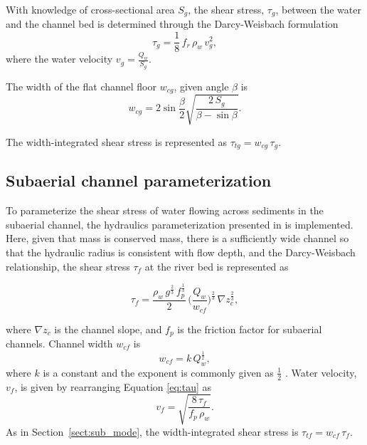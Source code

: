 \documentclass[11pt]{article}
\begin{document}
With knowledge of cross-sectional area $S_g$, the shear stress, $\tau_g$, between the water and the channel bed is determined through the Darcy-Weisbach formulation
\begin{equation}
  \label{eq:tau}
  \tau_g=\frac{1}{8}\,f_r\,\rho_w\,v_g^2,
\end{equation}
% 
where  the water velocity $v_g = \frac{Q_w}{S_g}$.

The width of the flat channel floor $w_{cg}$, given angle $\beta$ is 
\begin{equation}
  \label{eq:dh2wc}
  w_{cg} = 2  \sin \frac{\beta}{2} \sqrt{\frac{2\, S_g}{\beta -\sin \beta}}.
\end{equation}

The width-integrated shear stress is represented as $\tau_{tg}=w_{cg}\,\tau_g $.

\subsection{Subaerial channel  parameterization}
\label{sect:fluv}

To parameterize the shear stress of water flowing across sediments in the subaerial channel,  the hydraulics parameterization presented in \citet{tucker1997} is implemented.
Here, given  that mass is conserved mass, there is a sufficiently wide channel so that the hydraulic radius is consistent with flow depth, and the Darcy-Weisbach relationship,
the shear stress $\tau_f$ at the river bed is represented as
\begin{linenomath*}
  \begin{equation}
    \label{eq:DW_tau}
    \tau_f=\frac{\rho_w\,g^{\frac{2}{3}}\,f_p^{\frac{1}{3}}}{2}\, \Big(\frac{Q_w}{w_{cf}} \Big)^{\frac{2}{3}} \,\nabla z_c^{\frac{2}{3}},
  \end{equation}
\end{linenomath*}
where $\nabla z_c$ is the channel slope, and $f_p$ is the friction factor for subaerial channels.
Channel width $w_{cf}$ is 
\begin{equation}
  \label{eq:wcf}
  w_{cf} = k \, Q_w^\frac{1}{2},
\end{equation}
% 
where $k$ is a constant and the exponent is commonly given as $\frac{1}{2}$ \citep{leopold1953}.
Water velocity, $v_f$, is given by rearranging Equation \ref{eq:tau} as
\begin{equation}
  \label{eq:vf}
  v_f = \sqrt{\frac{8\,\tau_f}{f_p\,\rho_w}}.
\end{equation}
% 
As in Section~\ref{sect:sub_mode}, the width-integrated shear stress is $\tau_{tf}=w_{cf}\,\tau_f$.
\end{document}
